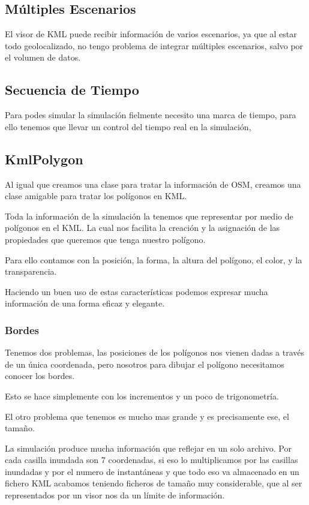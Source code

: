 \subsection*{Múltiples Escenarios}
El visor de KML puede recibir información de varios escenarios, ya que al estar
todo geolocalizado, no tengo problema de integrar múltiples
escenarios, salvo por el volumen de datos.
\subsection*{Secuencia de Tiempo}
Para podes simular la simulación fielmente necesito una marca de tiempo, para
ello tenemos que llevar un control del tiempo real en la simulación, 
\subsection*{KmlPolygon}
Al igual que creamos una clase para tratar la información de OSM, creamos una
clase amigable para tratar los polígonos en KML.

Toda la información de la simulación la tenemos que representar por medio de
polígonos en el KML. La cual nos facilita la creación y la asignación de las
propiedades que queremos que tenga nuestro polígono.

Para ello contamos con la posición, la forma, la altura del polígono, el color,
y la transparencia.

Haciendo un buen uso de estas características podemos expresar mucha
información de una forma eficaz y elegante.
\subsubsection*{Bordes}
Tenemos dos problemas, las posiciones de los polígonos nos vienen dadas a
través de un única coordenada, pero nosotros para dibujar el polígono
necesitamos conocer los bordes.

Esto se hace simplemente con los incrementos y un poco de trigonometría.

El otro problema que tenemos es mucho mas grande y es precisamente ese, el
tamaño.

La simulación produce mucha información que reflejar en un solo archivo. Por
cada casilla inundada son 7 coordenadas, si eso lo multiplicamos por las
casillas inundadas y por el numero de instantáneas y que todo eso va almacenado
en un fichero KML acabamos teniendo ficheros de tamaño muy considerable, que al
ser representados por un visor nos da un límite de información.

